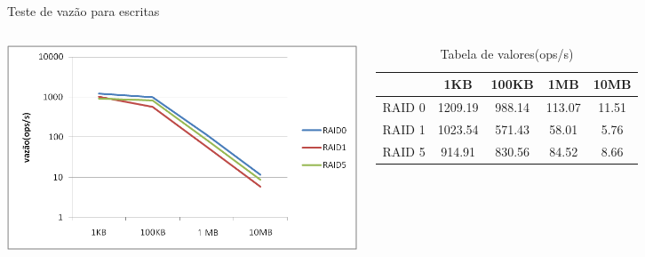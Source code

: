 \begin{frame}{}
	Teste de vazão para escritas
	\begin{columns}
		
		\includegraphics[width=\textwidth]{imagens/throughput_escrita}
		
		
		\begin{table}
			\caption{Tabela de valores(ops/s)}
			\tiny
			\begin{tabular}{|c|c|c|c|c|} \hline
				& 1KB & 100KB & 1MB & 10MB \\ \hline
				
				RAID 0	& 1209.19 & 988.14 & 113.07 & 11.51\\ \hline
				RAID 1	& 1023.54 & 571.43 & 58.01  & 5.76 \\ \hline
				RAID 5	& 914.91  & 830.56 & 84.52  & 8.66 \\ \hline
				
				
			\end{tabular}
		\end{table}
		
	\end{columns}
\end{frame}

